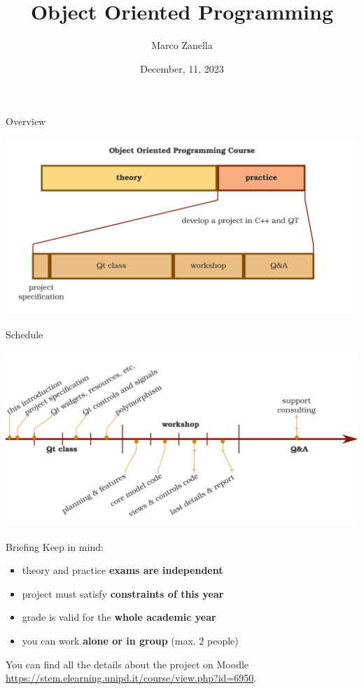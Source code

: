 \documentclass[11pt]{beamer}
\author{Marco Zanella}
\title{Object Oriented Programming}
\institute{University of Padova}
\date{December, 11, 2023}
\renewcommand{\emph}[1]{\textbf{#1}}
\begin{document}
\begin{frame}
\titlepage
\end{frame}

\begin{frame}{Overview}
 \begin{center}
  \includegraphics[width=1.0\textwidth]{assets/overview}
 \end{center}
\end{frame}

\begin{frame}{Schedule}
 \begin{center}
  \includegraphics[width=1.0\textwidth]{assets/schedule}
 \end{center}
\end{frame}

\begin{frame}{Briefing}
 Keep in mind:
 \begin{itemize}
  \item theory and practice \emph{exams are independent}
  \item project must satisfy \emph{constraints of this year}
  \item grade is valid for the \emph{whole academic year}
  \item you can work \emph{alone or in group} (max. 2 people)
 \end{itemize}
 You can find all the details about the project on Moodle \url{https://stem.elearning.unipd.it/course/view.php?id=6950}.
\end{frame}
\end{document}
